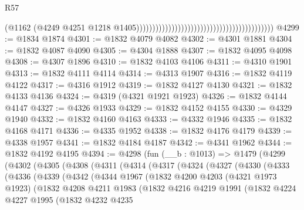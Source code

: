 \begin{lexlean}{R57}
\begin{coremodule}
                                                                                      (@1162
                                                                                        (@4249
                                                                                          @4251
                                                                                          @1218
                                                                                          @1405)))))))))))))))))))))))))))))))))))))))))))
@4299 := @1834 @1874
@4301 := @1832 @4079 @4082
@4302 := @4301 @1881
@4304 := @1832 @4087 @4090
@4305 := @4304 @1888
@4307 := @1832 @4095 @4098
@4308 := @4307 @1896
@4310 := @1832 @4103 @4106
@4311 := @4310 @1901
@4313 := @1832 @4111 @4114
@4314 := @4313 @1907
@4316 := @1832 @4119 @4122
@4317 := @4316 @1912
@4319 := @1832 @4127 @4130
@4321 := @1832 @4133 @4136
@4324 := @4319 (@4321 @1921 @1923)
@4326 := @1832 @4144 @4147
@4327 := @4326 @1933
@4329 := @1832 @4152 @4155
@4330 := @4329 @1940
@4332 := @1832 @4160 @4163
@4333 := @4332 @1946
@4335 := @1832 @4168 @4171
@4336 := @4335 @1952
@4338 := @1832 @4176 @4179
@4339 := @4338 @1957
@4341 := @1832 @4184 @4187
@4342 := @4341 @1962
@4344 := @1832 @4192 @4195
@4394 := @4298
    (fun (__b : @1013) =>
    @1479
      (@4299
        (@4302
          (@4305
            (@4308
              (@4311
                (@4314
                  (@4317
                    (@4324
                      (@4327
                        (@4330
                          (@4333
                            (@4336
                              (@4339
                                (@4342
                                  (@4344
                                    @1967
                                    (@1832
                                      @4200
                                      @4203
                                      (@4321 @1973 @1923)
                                      (@1832
                                        @4208
                                        @4211
                                        @1983
                                        (@1832
                                          @4216
                                          @4219
                                          @1991
                                          (@1832
                                            @4224
                                            @4227
                                            @1995
                                            (@1832
                                              @4232
                                              @4235

\end{coremodule}
\end{lexlean}
